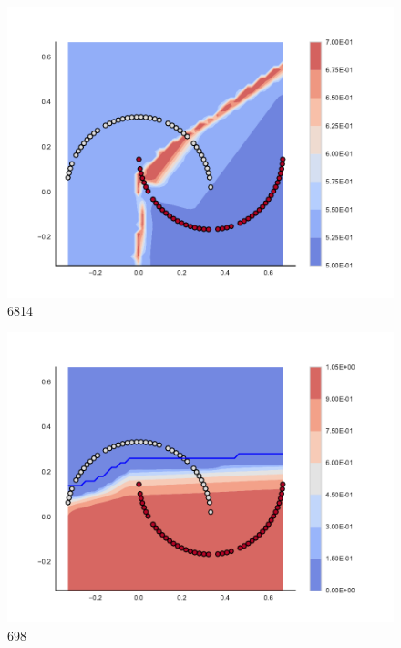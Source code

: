 \begin{subfigure}[b]{0.09\textwidth}
    \includegraphics[clip, trim=2.35cm 1.75cm 4.5cm 0cm,width=\textwidth]{img/convergence/6814.pdf}
    \caption{6814}
    \label{fig:convergence_6814}
\end{subfigure}
%
\begin{subfigure}[b]{0.09\textwidth}
    \includegraphics[clip, trim=2.35cm 1.75cm 4.5cm 0cm,width=\textwidth]{img/convergence/698.pdf}
    \caption{698}
    \label{fig:convergence_698}
\end{subfigure}
%
